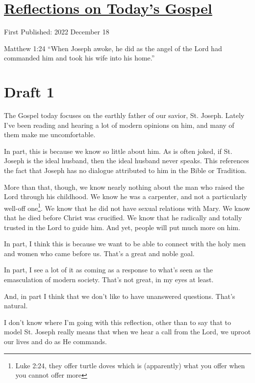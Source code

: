 \documentclass[12pt]{article}[titlepage]
\newcommand{\say}[1]{``#1''}
\newcommand{\1}{\={a}}
\newcommand{\2}{\={e}}
\newcommand{\3}{\={\i}}
\newcommand{\4}{\=o}
\newcommand{\5}{\=u}
\newcommand{\6}{\={A}}
\renewcommand{\,}{\textsuperscript{,}}
\begin{document}
\doublespacing
\section{\href{reflections-on-readings-2-advent-a-22.html}{Reflections on Today's Gospel}}
First Published: 2022 December 18

Matthew 1:24 \say{When Joseph awoke, he did as the angel of the Lord had commanded him and took his wife into his home.}

\section{Draft 1}
The Gospel today focuses on the earthly father of our savior, St. Joseph.
Lately I've been reading and hearing a lot of modern opinions on him, and many of them make me uncomfortable.

In part, this is because we know so little about him.
As is often joked, if St. Joseph is the ideal husband, then the ideal husband never speaks.
This references the fact that Joseph has no dialogue attributed to him in the Bible or Tradition.

More than that, though, we know nearly nothing about the man who raised the Lord through his childhood.
We know he was a carpenter, and not a particularly well-off one\footnote{Luke 2:24, they offer turtle doves which is (apparently) what you offer when you cannot offer more}.
We know that he did not have sexual relations with Mary.
We know that he died before Christ was crucified.
We know that he radically and totally trusted in the Lord to guide him.
And yet, people will put much more on him.

In part, I think this is because we want to be able to connect with the holy men and women who came before us.
That's a great and noble goal.

In part, I see a lot of it as coming as a response to what's seen as the emasculation of modern society.
That's not great, in my eyes at least.

And, in part I think that we don't like to have unanswered questions.
That's natural.

I don't know where I'm going with this reflection, other than to say that to model St. Joseph really means that when we hear a call from the Lord, we uproot our lives and do as He commands.
\end{document}
